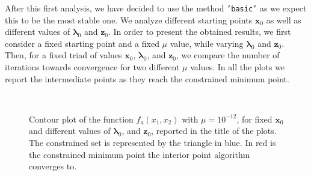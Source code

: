 \documentclass[a4paper,11pt]{article}
\begin{document}
\noindent After this first analysis, we have decided to use the method \texttt{'basic'} as we expect this to be the most stable one. We analyze different starting points $\textbf{x}_{0}$ as well as different  values of $\boldsymbol{\lambda}_{0}$ and $\textbf{z}_{0}$. 
In order to present the obtained results, we first consider a fixed starting point and a fixed $\mu$ value, while varying $\boldsymbol{\lambda}_{0}$ and $\textbf{z}_{0}$. Then, for a fixed triad of values $\textbf{x}_{0}$, $\boldsymbol{\lambda}_{0}$, and $\textbf{z}_{0}$, we compare the number of iterations towards convergence for two different $\mu$ values. In all the plots we report the intermediate points as they reach the constrained minimum point.
\begin{figure}[H]
	\centering
	\
	\caption{Contour plot of the function $f_{a}(x_{1},x_{2})$ with $\mu=10^{-12}$, for fixed $\textbf{x}_{0}$ and different values of $\boldsymbol{\lambda}_{0}$, and $\textbf{z}_{0}$, reported in the title of the plots. The constrained set is represented by the triangle in blue. In red is the constrained minimum point the interior point algorithm converges to.}
	\label{Fig:func_a}
\end{figure}
\end{document}
